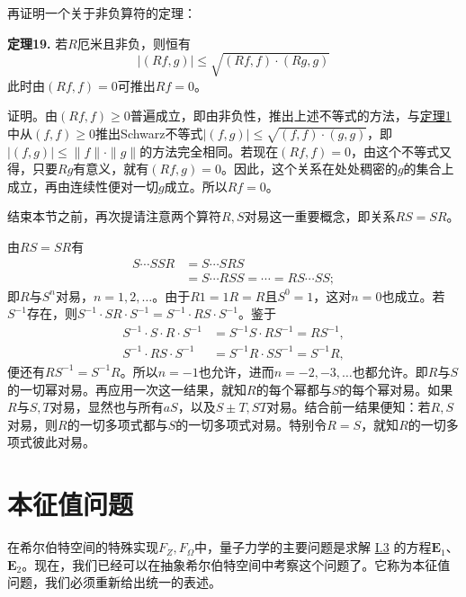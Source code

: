 \documentclass[fontsize=13pt,twoside,openany,headings=normal,parskip=false,bookmarkpackage=false,DIV=calc]{scrbook}
\newcommand{\textkaishu}[1]{{\zhkaishu #1}}
\begin{document}
再证明一个关于非负算符的定理：

\hypertarget{origpage-53}{}\label{origpage-53}\leavevmode{}\textbf{定理19.}\label{thm:II.19} 若$R$厄米且非负，则恒有
\[
|(Rf,g)|\leq\sqrt{(Rf,f)\cdot(Rg,g)}
\]
此时由$(Rf,\allowbreak f)=0$可推出$Rf=0$。

\textkaishu{证明。}由$(Rf,\allowbreak f)\geq0$普遍成立，即由非负性，推出上述不等式的方法，与\CJKglue \hyperref[thm:II.1]{定理1} 中从$(f,\allowbreak f)\geq0$推出Schwarz不等式$|(f,\allowbreak g)|\leq\sqrt{(f,\allowbreak f)\cdot(g,\allowbreak g)}$，即$|(f,\allowbreak g)|\leq\|f\|\cdot\|g\|$的方法完全相同。若现在$(Rf,\allowbreak f)=0$，由这个不等式又得，只要$Rg$有意义，就有$(Rf,\allowbreak g)=0$。因此，这个关系在处处稠密的$g$的集合上成立，再由连续性便对一切$g$成立。所以$Rf=0$。

结束本节之前，再次提请注意两个算符$R,\allowbreak S$对易这一重要概念，即关系$RS=SR$。

由$RS=SR$有
\begin{align*}
S\cdots SSR&=S\cdots SRS\\
&=S\cdots RSS=\cdots=RS\cdots SS;
\end{align*}
即$R$与$S^n$对易，$n=1,\allowbreak 2,\allowbreak \ldots$。由于$R1=1R=R$且$S^0=1$，这对$n=0$也成立。若$S^{-1}$存在，则$S^{-1}\cdot SR\cdot S^{-1}=S^{-1}\cdot RS\cdot S^{-1}$。鉴于
\begin{align*}
S^{-1}\cdot S\cdot R\cdot S^{-1}&=S^{-1}S\cdot RS^{-1}=RS^{-1},\\
S^{-1}\cdot RS\cdot S^{-1}&=S^{-1}R\cdot SS^{-1}=S^{-1}R,
\end{align*}
便还有$RS^{-1}=S^{-1}R$。所以$n=-1$也允许，进而$n=-2,\allowbreak -3,\allowbreak \ldots$也都允许。即$R$与$S$的一切幂对易。再应用一次这一结果，就知$R$的每个幂都与$S$的每个幂对易。如果$R$与$S,\allowbreak T$对易，显然也与所有$aS$，以及$S\pm T,\allowbreak ST$对易。结合前一结果便知：若$R,\allowbreak S$对易，则$R$的一切多项式都与$S$的一切多项式对易。特别令$R=S$，就知$R$的一切多项式彼此对易。

\section{本征值问题}\label{sec:II.6}
在希尔伯特空间的特殊实现$F_Z,\allowbreak F_\Omega$中，量子力学的主要问题是求解 \hyperref[sec:I.3]{I.3} 的方程$\hyperref[eq:I.3.E1]{\mathbf{E}_1}$、$\hyperref[eq:I.3.E2]{\mathbf{E}_2}$。现在，我们已经可以在抽象希尔伯特空间中考察这个问题了。它称为本征值问题，我们必须重新给出统一的表述。
\end{document}
